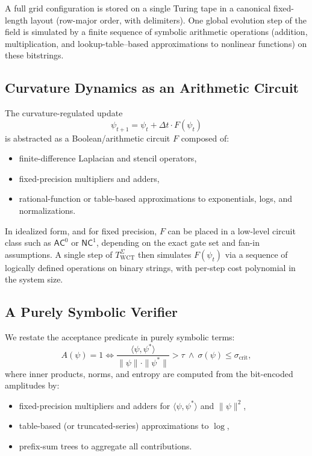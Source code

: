 \documentclass[12pt]{article}
\theoremstyle{remark}
\begin{document}
A full grid configuration is stored on a single Turing tape in a canonical fixed-length layout (row-major order, with delimiters). One global evolution step of the field is simulated by a finite sequence of symbolic arithmetic operations (addition, multiplication, and lookup-table–based approximations to nonlinear functions) on these bitstrings.

\subsection{Curvature Dynamics as an Arithmetic Circuit}

The curvature-regulated update
\[
\psi_{t+1} = \psi_t + \Delta t \cdot F(\psi_t)
\]
is abstracted as a Boolean/arithmetic circuit \(F\) composed of:

\begin{itemize}
  \item finite-difference Laplacian and stencil operators,
  \item fixed-precision multipliers and adders,
  \item rational-function or table-based approximations to exponentials, logs, and normalizations.
\end{itemize}

In idealized form, and for fixed precision, \(F\) can be placed in a low-level circuit class such as \(\textsf{AC}^0\) or \(\textsf{NC}^1\), depending on the exact gate set and fan-in assumptions. A single step of \(T_{\text{WCT}}^\Sigma\) then simulates \(F(\psi_t)\) via a sequence of logically defined operations on binary strings, with per-step cost polynomial in the system size.

\subsection{A Purely Symbolic Verifier}

We restate the acceptance predicate in purely symbolic terms:
\[
A(\psi) = 1 \iff \frac{\langle \psi, \psi^* \rangle}{\|\psi\| \cdot \|\psi^*\|} > \tau \ \land\ \sigma(\psi) \leq \sigma_{\text{crit}},
\]
where inner products, norms, and entropy are computed from the bit-encoded amplitudes by:

\begin{itemize}
  \item fixed-precision multipliers and adders for \(\langle \psi, \psi^* \rangle\) and \(\|\psi\|^2\),
  \item table-based (or truncated-series) approximations to \(\log\),
  \item prefix-sum trees to aggregate all contributions.
\end{itemize}
\end{document}
